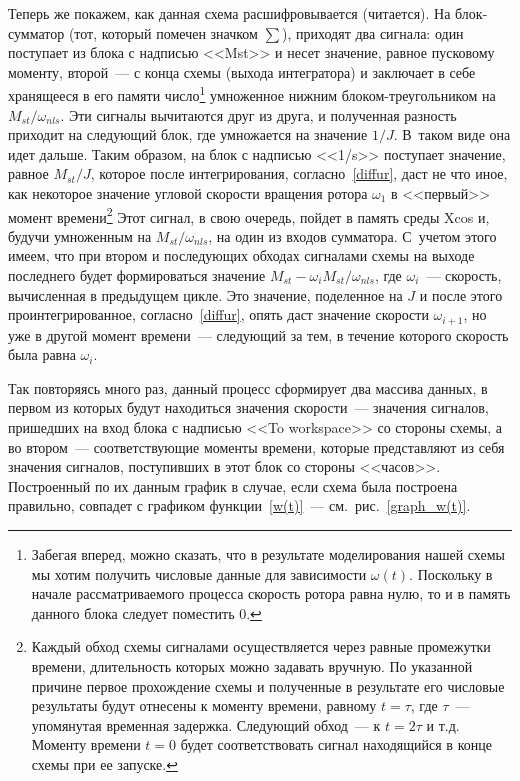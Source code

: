 \documentclass[12pt,a4paper,openany]{extarticle}
\begin{document}
Теперь же покажем, как данная схема расшифровывается (читается). 
На блок-сумматор (тот, который помечен значком $\sum$), приходят два сигнала: один поступает из блока с надписью <<Mst>> и несет значение, равное пусковому моменту, второй~--- с конца схемы (выхода интегратора) и заключает в себе хранящееся в его памяти число\lefteqn{,}\footnote{Забегая вперед, можно сказать, что в результате моделирования нашей схемы мы хотим получить числовые данные для зависимости $\omega(t)$. Поскольку в начале рассматриваемого процесса скорость ротора равна нулю, то и в память данного блока следует поместить $0$.}  умноженное нижним блоком-треугольником на $M_{st}/\omega_{nls}$.
Эти сигналы вычитаются друг из друга, и полученная разность приходит на следующий блок, где умножается на значение $1/J$.
В~таком виде она идет дальше.
Таким образом, на блок с надписью <<1/s>> поступает значение, равное $M_{st}/J$, которое после интегрирования, согласно~\eqref{diffur}, даст не что иное, как некоторое значение угловой скорости вращения ротора $\omega_1$ в <<первый>> момент времени\footnote{Каждый обход схемы сигналами осуществляется через равные промежутки времени, длительность которых можно задавать вручную. По указанной причине первое прохождение схемы и полученные в результате его числовые результаты будут отнесены к моменту времени, равному $t = \tau$, где $\tau$~--- упомянутая временная задержка. Следующий обход~--- к $t = 2\tau$ и т.д. Моменту времени $t = 0$ будет соответствовать сигнал находящийся в конце схемы при ее запуске.}
Этот сигнал, в свою очередь, пойдет в память среды Xcos и, будучи умноженным на $M_{st}/\omega_{nls}$, на один из входов сумматора. 
С~учетом этого имеем, что при втором и последующих обходах сигналами схемы на выходе последнего будет формироваться значение $M_{st}-\omega_i M_{st}/\omega_{nls}$, где $\omega_i$~--- скорость, вычисленная в предыдущем цикле. 
Это значение, поделенное на $J$ и после этого проинтегрированное, согласно~\eqref{diffur}, опять даст значение скорости $\omega_{i+1}$, но уже в другой момент времени~--- следующий за тем, в течение которого скорость была равна $\omega_i$.  

Так повторяясь много раз, данный процесс сформирует два массива данных, в первом из которых будут находиться значения скорости~--- значения сигналов, пришедших на вход блока с надписью <<To workspace>> со стороны схемы, а во втором~--- соответствующие моменты времени, которые представляют из себя значения сигналов, поступивших в этот блок со стороны <<часов>>.
Построенный по их данным график в случае, если схема была построена правильно, совпадет с графиком функции~\eqref{w(t)}~--- см.~рис.~\ref{graph_w(t)}.
\end{document}
